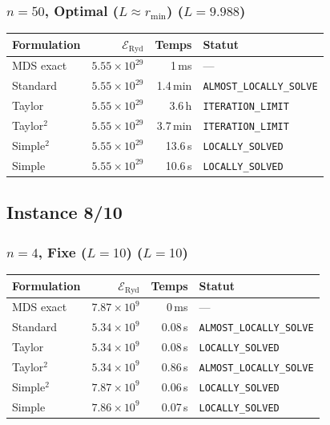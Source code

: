 \subsubsection{$n=50$, Optimal ($L{\approx}r_{\min}$) ($L=9.988$)}
\begin{longtable}{@{}lrrl@{}}
  \toprule
  Formulation & $\mathcal{E}_{\mathrm{Ryd}}$ & Temps & Statut \\
  \midrule
  \endhead
  MDS exact & $5.55\times10^{29}$ & 1\,ms & --- \\
  Standard & $5.55\times10^{29}$ & 1.4\,min & \texttt{ALMOST\_LOCALLY\_SOLVE} \\
  Taylor & $5.55\times10^{29}$ & 3.6\,h & \texttt{ITERATION\_LIMIT} \\
  Taylor$^2$ & $5.55\times10^{29}$ & 3.7\,min & \texttt{ITERATION\_LIMIT} \\
  Simple$^2$ & $5.55\times10^{29}$ & 13.6\,s & \texttt{LOCALLY\_SOLVED} \\
  Simple & $5.55\times10^{29}$ & 10.6\,s & \texttt{LOCALLY\_SOLVED} \\
  \bottomrule
\end{longtable}

\subsection{Instance 8/10}
\subsubsection{$n=4$, Fixe ($L{=}10$) ($L=10$)}
\begin{longtable}{@{}lrrl@{}}
  \toprule
  Formulation & $\mathcal{E}_{\mathrm{Ryd}}$ & Temps & Statut \\
  \midrule
  \endhead
  MDS exact & $7.87\times10^{9}$ & 0\,ms & --- \\
  Standard & $5.34\times10^{9}$ & 0.08\,s & \texttt{ALMOST\_LOCALLY\_SOLVE} \\
  Taylor & $5.34\times10^{9}$ & 0.08\,s & \texttt{LOCALLY\_SOLVED} \\
  Taylor$^2$ & $5.34\times10^{9}$ & 0.86\,s & \texttt{ALMOST\_LOCALLY\_SOLVE} \\
  Simple$^2$ & $7.87\times10^{9}$ & 0.06\,s & \texttt{LOCALLY\_SOLVED} \\
  Simple & $7.86\times10^{9}$ & 0.07\,s & \texttt{LOCALLY\_SOLVED} \\
  \bottomrule
\end{longtable}

